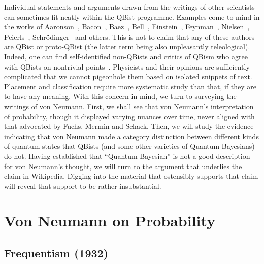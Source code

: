 \documentclass[aps,pra,superscriptaddress,12pt,tightenlines,nofootinbib]{revtex4-2}
\begin{document}
Individual statements and arguments drawn from the writings of other
scientists can sometimes fit neatly within the QBist programme.
Examples come to mind in the works of Aaronson~\cite[pp.\ xii--xiii,
  110]{Aaronson2013}, Bacon~\cite{Bacon2005}, Baez~\cite{Baez2003},
Bell~\cite{Mermin-Vienna, Mermin-Bell}, Einstein~\cite{Fuchs2014b},
Feynman~\cite[p.\ 6\,-7]{FeynmanLP}, Nielsen~\cite{Nielsen2004b},
Peierls~\cite{Mermin-Bell}, Schr\"odinger~\cite{Mermin14,
  Mermin-Vienna, Mermin-Bell} and others.  This is not to claim that
any of these authors are QBist or proto-QBist (the latter term being
also unpleasantly teleological).  Indeed, one can find self-identified
non-QBists and critics of QBism who agree with QBists on nontrivial
points~\cite{Moldoveanu2015, Brukner2015}.  Physicists and their
opinions are sufficiently complicated that we cannot pigeonhole them
based on isolated snippets of text.  Placement and classification
require more systematic study than that, if they are to have any
meaning.  With this concern in mind, we turn to surveying the writings
of von Neumann.  First, we shall see that von Neumann's interpretation
of probability, though it displayed varying nuances over time, never
aligned with that advocated by Fuchs, Mermin and Schack.  Then, we
will study the evidence indicating that von Neumann made a category
distinction between different kinds of quantum states that QBists (and
some other varieties of Quantum Bayesians) do not.  Having established
that ``Quantum Bayesian'' is not a good description for von Neumann's
thought, we will turn to the argument that underlies the claim in
Wikipedia.  Digging into the material that ostensibly supports that
claim will reveal that support to be rather insubstantial.


\section{Von Neumann on Probability}

\subsection{Frequentism (1932)}
\end{document}

